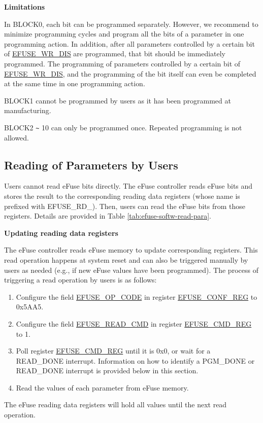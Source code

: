 \documentclass[main\_\_EN.tex]{subfiles}
\begin{document}
{\bfseries Limitations}

In BLOCK0, each bit can be programmed separately. However, we recommend to minimize programming cycles and program all the bits of a parameter in one programming action. In addition, after all parameters controlled by a certain bit of \hyperref[fielddesc:EFUSEWRDIS]{EFUSE\_WR\_DIS} are programmed, that bit should be immediately programmed. The programming of parameters controlled by a certain bit of \hyperref[fielddesc:EFUSEWRDIS]{EFUSE\_WR\_DIS},
and the programming of the bit itself can even be completed at the same time in one programming action.

BLOCK1 cannot be programmed by users as it has been programmed at manufacturing.

BLOCK2 \verb+~+ 10 can only be programmed once. Repeated programming is not allowed.

\subsection{Reading of Parameters by Users}
\label{sec:efuse-software-read-para}

Users cannot read eFuse bits directly. The eFuse controller reads eFuse bits and stores the result to the corresponding reading data registers (whose name is prefixed with EFUSE\_RD\_). Then, users can read the eFuse bits from those registers. Details are provided in Table \ref{tab:efuse-softw-read-para}.



{\bfseries Updating reading data registers}
\label{sec:efuse-update-reg}

The eFuse controller reads eFuse memory to update corresponding registers. This read operation happens at system reset and can also be triggered manually by users as needed (e.g., if new eFuse values have been programmed). The process of triggering a read operation by users is as follows:

\begin{enumerate}
    \item Configure the field \hyperref[fielddesc:EFUSEOPCODE]{EFUSE\_OP\_CODE} in register \hyperref[regdesc:EFUSECONFREG]{EFUSE\_CONF\_REG} to 0x5AA5.
    \item Configure the field \hyperref[fielddesc:EFUSEREADCMD]{EFUSE\_READ\_CMD} in register \hyperref[regdesc:EFUSECMDREG]{EFUSE\_CMD\_REG} to 1.
    \item Poll register \hyperref[regdesc:EFUSECMDREG]{EFUSE\_CMD\_REG} until it is 0x0, or wait for a READ\_DONE interrupt. Information on how to identify a PGM\_DONE or READ\_DONE interrupt is provided below in this section.
    \item Read the values of each parameter from eFuse memory.
\end{enumerate}
The eFuse reading data registers will hold all values until the next read operation.
\end{document}

